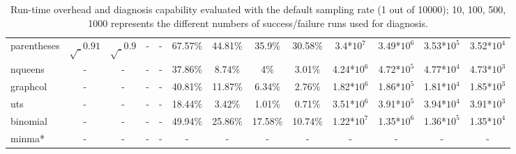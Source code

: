 \begin{table}[h!]
\begin{tabular}{lcccccccccccc}
    parentheses  & $\surd_{0.91}$ & $\surd_{0.9}$ & - & - & 67.57\% & 44.81\% & 35.9\% & 30.58\% & 3.4*${10^7}$ & 3.49*${10^6}$ & 3.53*$10^{5}$ & 3.52*$10^{4}$ \\
    nqueens    & - & - & - & - & 37.86\% & 8.74\% & 4\% & 3.01\% & 4.24*${10^6}$ & 4.72*${10^5}$ & 4.77*$10^{4}$ & 4.73*$10^{3}$ \\
    graphcol  & - & - & - & - & 40.81\% & 11.87\% & 6.34\% & 2.76\% & 1.82*${10^6}$ & 1.86*${10^5}$ & 1.81*$10^{4}$ & 1.85*$10^{3}$ \\
    uts     & - & - & - & - & 18.44\% & 3.42\% & 1.01\% & 0.71\% & 3.51*${10^6}$ & 3.91*${10^5}$ & 3.94*${10^4}$ & 3.91*${10^3}$ \\
    binomial & - & - & - & - & 49.94\% & 25.86\% & 17.58\% & 10.74\% & 1.22*${10^7}$ & 1.35*${10^6}$ & 1.36*$10^{5}$ & 1.35*$10^{4}$ \\
    minma*    & - & - & - & - & - & - & - & - & - & - & - & - \\


    \bottomrule
   \end{tabular}
  \caption{Run-time overhead and diagnosis capability evaluated with the default sampling rate (1 out of 10000); 10, 100, 500, 1000 represents the different numbers of success/failure runs used for diagnosis.}
  \label{tab:LBR}
\end{table}